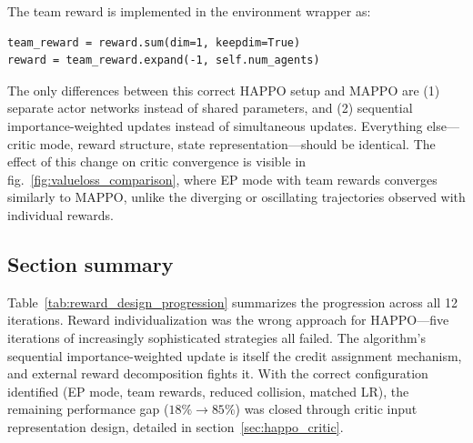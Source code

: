 The team reward is implemented in the environment wrapper as:

\begin{lstlisting}[style=pythonstyle, caption={Team reward broadcasting in the HARL environment wrapper.}, label={lst:team_reward}]
team_reward = reward.sum(dim=1, keepdim=True)
reward = team_reward.expand(-1, self.num_agents)
\end{lstlisting}

The only differences between this correct HAPPO setup and MAPPO are (1) separate actor networks instead of shared parameters, and (2) sequential importance-weighted updates instead of simultaneous updates. Everything else---critic mode, reward structure, state representation---should be identical. The effect of this change on critic convergence is visible in fig.~\ref{fig:valueloss_comparison}, where EP mode with team rewards converges similarly to MAPPO, unlike the diverging or oscillating trajectories observed with individual rewards.


\subsection{Section summary}
\label{sec:reward_design_summary}

Table~\ref{tab:reward_design_progression} summarizes the progression across all 12 iterations. Reward individualization was the wrong approach for HAPPO---five iterations of increasingly sophisticated strategies all failed. The algorithm's sequential importance-weighted update is itself the credit assignment mechanism, and external reward decomposition fights it. With the correct configuration identified (EP mode, team rewards, reduced collision, matched LR), the remaining performance gap ($18\% \to 85\%$) was closed through critic input representation design, detailed in section~\ref{sec:happo_critic}.

